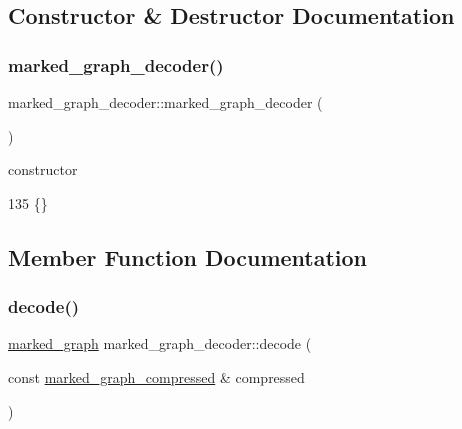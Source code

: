 \subsection{Constructor \& Destructor Documentation}
\mbox{\label{classmarked__graph__decoder_ad13aa15246efd3754b3ba7d2c28300d9}} 
\subsubsection{\texorpdfstring{marked\+\_\+graph\+\_\+decoder()}{marked\_graph\_decoder()}}
{\footnotesize\ttfamily marked\+\_\+graph\+\_\+decoder\+::marked\+\_\+graph\+\_\+decoder (\begin{DoxyParamCaption}{ }\end{DoxyParamCaption})\hspace{0.3cm}{\ttfamily [inline]}}



constructor 


\begin{DoxyCode}
135 \{\}
\end{DoxyCode}


\subsection{Member Function Documentation}
\mbox{\label{classmarked__graph__decoder_a31bbd76091acf5b058fd0a7b7948f74c}} 
\subsubsection{\texorpdfstring{decode()}{decode()}}
{\footnotesize\ttfamily \hyperlink{classmarked__graph}{marked\+\_\+graph} marked\+\_\+graph\+\_\+decoder\+::decode (\begin{DoxyParamCaption}\item[{const \hyperlink{classmarked__graph__compressed}{marked\+\_\+graph\+\_\+compressed} \&}]{compressed }\end{DoxyParamCaption})}



